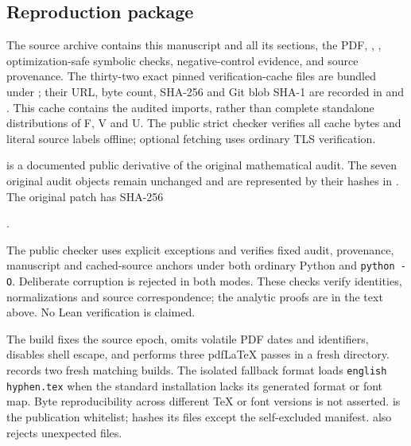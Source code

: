 \subsection{Reproduction package}
The source archive contains this manuscript and all its sections, the PDF,
, , optimization-safe symbolic checks,
negative-control evidence, and source provenance. The thirty-two exact pinned
verification-cache files are bundled under ; their URL, byte
count, SHA-256 and Git blob SHA-1 are recorded in
 and
. This cache contains the audited
imports, rather than complete standalone distributions of F, V and U.
The public strict checker verifies all cache bytes and literal source labels
offline; optional fetching uses ordinary TLS verification.

 is a documented public derivative of the original
mathematical audit. The seven original audit objects remain unchanged and
are represented by their hashes in .
The original patch has SHA-256
\begin{center}\small
{}.
\end{center}
The public checker uses explicit exceptions and verifies fixed audit,
provenance, manuscript and cached-source anchors under both ordinary Python
and \texttt{python -O}. Deliberate corruption is rejected in both modes.
These checks verify identities, normalizations and source correspondence;
the analytic proofs are in the text above. No Lean verification is claimed.

The build fixes the source epoch, omits volatile PDF dates and identifiers,
disables shell escape, and performs three pdfLaTeX passes in a fresh
directory.  records two fresh matching builds.
The isolated fallback format loads \texttt{english hyphen.tex} when the
standard installation lacks its generated format or font map.
Byte reproducibility across different TeX or font versions is not asserted.
 is the publication whitelist;
 hashes its files except the self-excluded
manifest.  also rejects unexpected files.
